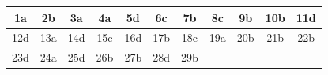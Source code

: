 \begin{table}[!ht]
\centering
\begin{tabular}{|c|c|c|c|c|c|c|c|c|c|c|}
\hline
1a & 2b & 3a & 4a & 5d & 6c & 7b & 8c & 9b & 10b & 11d \\ \hline
12d & 13a & 14d & 15c & 16d & 17b & 18c & 19a & 20b & 21b & 22b \\ \hline
23d & 24a & 25d & 26b & 27b & 28d & 29b &  &  &  &  \\ \hline
\end{tabular}
\end{table}